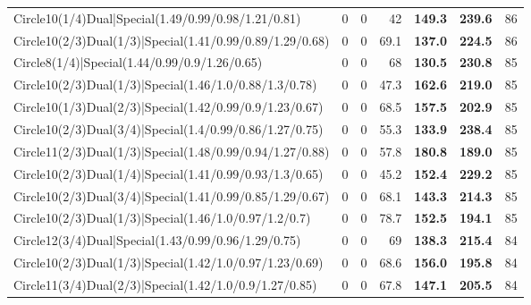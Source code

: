 \begin{tabular}{lrrrllr}
 Circle10(1/4)Dual|Special(1.49/0.99/0.98/1.21/0.81)            &          0   &            0   &          42   & \textbf{149.3} & \textbf{239.6} &           86 \\
 Circle10(2/3)Dual(1/3)|Special(1.41/0.99/0.89/1.29/0.68)       &          0   &            0   &          69.1 & \textbf{137.0} & \textbf{224.5} &           86 \\
 Circle8(1/4)|Special(1.44/0.99/0.9/1.26/0.65)                  &          0   &            0   &          68   & \textbf{130.5} & \textbf{230.8} &           85 \\
 Circle10(2/3)Dual(1/3)|Special(1.46/1.0/0.88/1.3/0.78)         &          0   &            0   &          47.3 & \textbf{162.6} & \textbf{219.0} &           85 \\
 Circle10(1/3)Dual(2/3)|Special(1.42/0.99/0.9/1.23/0.67)        &          0   &            0   &          68.5 & \textbf{157.5} & \textbf{202.9} &           85 \\
 Circle10(2/3)Dual(3/4)|Special(1.4/0.99/0.86/1.27/0.75)        &          0   &            0   &          55.3 & \textbf{133.9} & \textbf{238.4} &           85 \\
 Circle11(2/3)Dual(1/3)|Special(1.48/0.99/0.94/1.27/0.88)       &          0   &            0   &          57.8 & \textbf{180.8} & \textbf{189.0} &           85 \\
 Circle10(2/3)Dual(1/4)|Special(1.41/0.99/0.93/1.3/0.65)        &          0   &            0   &          45.2 & \textbf{152.4} & \textbf{229.2} &           85 \\
 Circle10(2/3)Dual(3/4)|Special(1.41/0.99/0.85/1.29/0.67)       &          0   &            0   &          68.1 & \textbf{143.3} & \textbf{214.3} &           85 \\
 Circle10(2/3)Dual(1/3)|Special(1.46/1.0/0.97/1.2/0.7)          &          0   &            0   &          78.7 & \textbf{152.5} & \textbf{194.1} &           85 \\
 Circle12(3/4)Dual|Special(1.43/0.99/0.96/1.29/0.75)            &          0   &            0   &          69   & \textbf{138.3} & \textbf{215.4} &           84 \\
 Circle10(2/3)Dual(1/3)|Special(1.42/1.0/0.97/1.23/0.69)        &          0   &            0   &          68.6 & \textbf{156.0} & \textbf{195.8} &           84 \\
 Circle11(3/4)Dual(2/3)|Special(1.42/1.0/0.9/1.27/0.85)         &          0   &            0   &          67.8 & \textbf{147.1} & \textbf{205.5} &           84 \\

\end{tabular}
